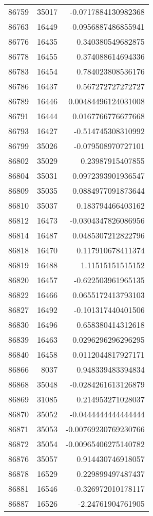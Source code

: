 \begin{tabular}{r | r | r}
86759 & 35017 & -0.0717884130982368 \\
86763 & 16449 & -0.0956887486855941 \\
86776 & 16435 & 0.340380549682875 \\
86778 & 16455 & 0.374088614694336 \\
86783 & 16454 & 0.784023808536176 \\
86786 & 16437 & 0.567272727272727 \\
86789 & 16446 & 0.00484496124031008 \\
86791 & 16444 & 0.0167766776677668 \\
86793 & 16427 & -0.514745308310992 \\
86799 & 35026 & -0.079508970727101 \\
86802 & 35029 & 0.23987915407855 \\
86804 & 35031 & 0.0972393901936547 \\
86809 & 35035 & 0.0884977091873644 \\
86810 & 35037 & 0.183794466403162 \\
86812 & 16473 & -0.0304347826086956 \\
86814 & 16487 & 0.0485307212822796 \\
86818 & 16470 & 0.117910678411374 \\
86819 & 16488 & 1.11515151515152 \\
86820 & 16457 & -0.622503961965135 \\
86822 & 16466 & 0.0655172413793103 \\
86827 & 16492 & -0.101317440401506 \\
86830 & 16496 & 0.658380414312618 \\
86839 & 16463 & 0.0296296296296295 \\
86840 & 16458 & 0.0112044817927171 \\
86866 & 8037 & 0.948339483394834 \\
86868 & 35048 & -0.0284261613126879 \\
86869 & 31085 & 0.214953271028037 \\
86870 & 35052 & -0.0444444444444444 \\
86871 & 35053 & -0.00769230769230766 \\
86872 & 35054 & -0.00965406275140782 \\
86876 & 35057 & 0.914430746918057 \\
86878 & 16529 & 0.229899497487437 \\
86881 & 16546 & -0.326972010178117 \\
86887 & 16526 & -2.24761904761905 \\

\end{tabular}
